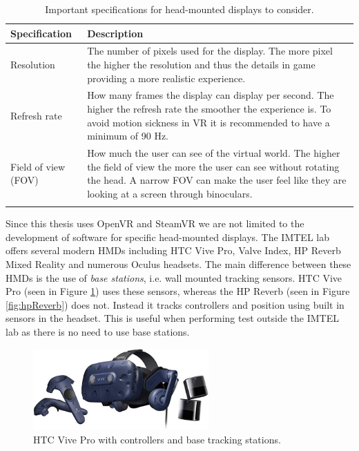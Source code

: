 \begin{table}[!ht]
      \centering
      \caption{Important specifications for head-mounted displays to consider.}
        \begin{tabularx}{\textwidth}{l X}
        \toprule
       Specification & Description                                                                           
       \\ 
       \midrule
       \vspace{0.2cm}
        Resolution & The number of pixels used for the display. The more pixel the higher the resolution and thus the details in game providing a more realistic experience.                                   
        \\
        \vspace{0.2cm}
        Refresh rate & How many frames the display can display per second. The higher the refresh rate the smoother the experience is. To avoid motion sickness in VR it is recommended to have a minimum of 90 Hz. 
        \\
        \vspace{0.2cm}
        Field of view (FOV) & How much the user can see of the virtual world. The higher the field of view the more the user can see without rotating the head. A narrow FOV can make the user feel like they are looking at a screen through binoculars.
        \\
        \bottomrule
        \label{table:hmdSpecs}
        \end{tabularx}
\end{table}


Since this thesis uses OpenVR and SteamVR we are not limited to the development of software for specific head-mounted displays. The IMTEL lab offers several modern HMDs including HTC Vive Pro, Valve Index, HP Reverb Mixed Reality and numerous Oculus headsets. The main difference between these HMDs is the use of \textit{base stations}, i.e. wall mounted tracking sensors. HTC Vive Pro (seen in Figure \ref{fig:htcVivePro}) uses these sensors, whereas the HP Reverb (seen in Figure \ref{fig:hpReverb}) does not. Instead it tracks controllers and position using built in sensors in the headset. This is useful when performing test outside the IMTEL lab as there is no need to use base stations.   

\begin{figure}[!ht]
    \centering
    \includegraphics[width=0.6\textwidth]{./fig/background/htcVivePro.jpg}
    \caption{HTC Vive Pro with controllers and base tracking stations.}
    \label{fig:htcVivePro}
\end{figure}

